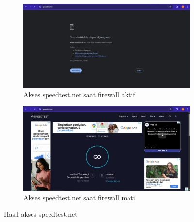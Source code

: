 \begin{figure}[H]
	\centering
	\begin{subfigure}[b]{0.4\linewidth}
		\centering
		\includegraphics[width=\linewidth]{P4/img/speedtest fw in.jpg}
		\caption{Akses speedtest.net saat firewall aktif\label{fig:konfigurasiR1}}
	\end{subfigure}
	\begin{subfigure}[b]{0.4\linewidth}
		\centering
		\includegraphics[width=\linewidth]{P4/img/speedtest fw off.jpg}
		\caption{Akses speedtest.net saat firewall mati\label{fig:konfigurasiR2}}
	\end{subfigure}
	\caption{Hasil akses speedtest.net}
	\hspace{1cm}
\end{figure}

